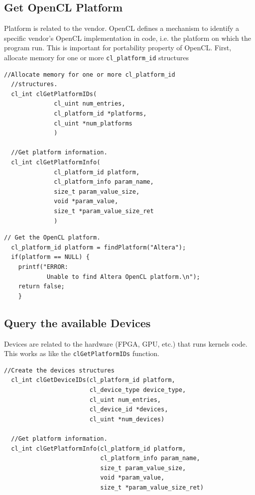 \documentclass{article}
\begin{document}
  \subsection{Get OpenCL Platform}
  Platform is related to the vendor. OpenCL defines a mechanism to identify a specific vendor’s OpenCL implementation in code, i.e. the platform on which the program run. This is important for portability property of OpenCL.
  First, allocate memory for one or more \texttt{cl{\_}platform{\_}id} structures

  \begin{lstlisting}[title={Normal Use}]
  //Allocate memory for one or more cl_platform_id
  //structures.
  cl_int clGetPlatformIDs(
              cl_uint num_entries,
              cl_platform_id *platforms,
              cl_uint *num_platforms
              )

  //Get platform information.
  cl_int clGetPlatformInfo(
              cl_platform_id platform,
              cl_platform_info param_name,
              size_t param_value_size,
              void *param_value,
              size_t *param_value_size_ret
              )
  \end{lstlisting}

  \begin{lstlisting}[title={Intel Altera use}]
  // Get the OpenCL platform.
  cl_platform_id platform = findPlatform("Altera");
  if(platform == NULL) {
    printf("ERROR:
            Unable to find Altera OpenCL platform.\n");
    return false;
    }
  \end{lstlisting}

  \subsection{Query the available Devices}
  Devices are related to the hardware (FPGA, GPU, etc.) that runs kernels code. This works as like the \texttt{clGetPlatformIDs} function. 

  \begin{lstlisting}[title={Normal Use}]
  //Create the devices structures
  cl_int clGetDeviceIDs(cl_platform_id platform,
                        cl_device_type device_type,
                        cl_uint num_entries,
                        cl_device_id *devices,
                        cl_uint *num_devices)

  //Get platform information.
  cl_int clGetPlatformInfo(cl_platform_id platform,
                           cl_platform_info param_name,
                           size_t param_value_size,
                           void *param_value,
                           size_t *param_value_size_ret)
  \end{lstlisting}
\end{document}
